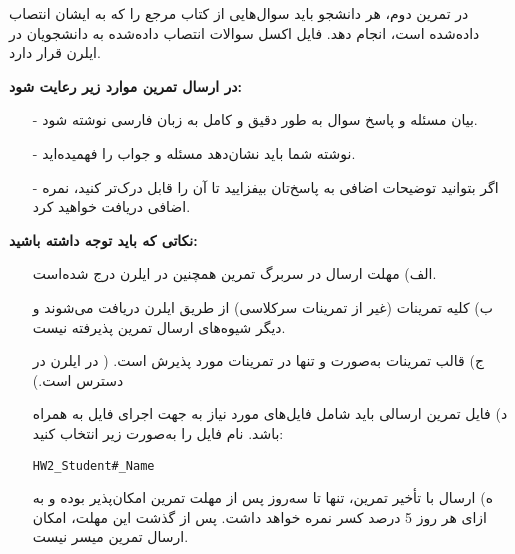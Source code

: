 در تمرین دوم، هر دانشجو باید سوال‌هایی از کتاب مرجع را که به ایشان انتصاب داده‌شده است، انجام دهد. فایل اکسل سوالات انتصاب داده‌شده به دانشجویان در ایلرن قرار دارد.

\textbf{در ارسال تمرین موارد زیر رعایت شود:}

\begin{itemize}
	\item[-]
	 بیان مسئله و پاسخ سوال به طور دقیق و کامل به زبان فارسی نوشته شود.

	\item[-]	
	 نوشته شما باید نشان‌دهد مسئله و جواب را فهمیده‌اید.
	
	\item[-]	
	اگر بتوانید توضیحات اضافی به پاسخ‌تان بیفزایید تا آن را قابل‌ درک‌تر کنید، نمره اضافی دریافت خواهید کرد.
\end{itemize}

\textbf{نکاتی که باید توجه داشته باشید:}

\begin{itemize}
	\item[الف)]
	مهلت ارسال در سربرگ تمرین همچنین در ایلرن درج شده‌است.
	\item[ب)]
	کلیه تمرینات (غیر از تمرینات سرکلاسی) از طریق ایلرن دریافت می‌شوند و دیگر شیوه‌های ارسال تمرین پذیرفته نیست.
	\item[ج)]
	قالب تمرینات به‌صورت \lr{\LaTeX} و تنها در  تمرینات مورد پذیرش است. ( در ایلرن در دسترس است.)
	\item[د)]	
	فایل تمرین ارسالی باید شامل فایل‌های مورد نیاز به جهت اجرای فایل \lr{\LaTeX} به همراه  باشد. نام فايل را به‌صورت زير انتخاب كنيد:

\begin{latin} \begin{center}
		\texttt{HW2\_Student\#\_Name}
	\end{center}
\end{latin}

	\item[ه)]
	ارسال با تأخیر تمرین، تنها تا سه‌روز پس از مهلت تمرین امکان‌پذیر بوده و به ازای هر روز 5 درصد کسر نمره خواهد داشت. پس از گذشت این مهلت، امکان ارسال تمرین میسر نیست.
\end{itemize}
